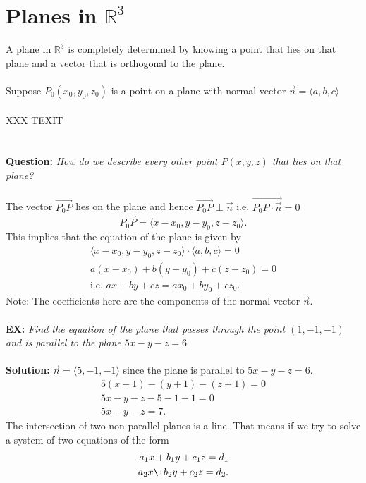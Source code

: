 \documentclass{report}
\begin{document}
\section{Planes in $\mathbb{R}^3$}
A plane in $\mathbb{R}^3$ is completely determined by knowing a point that lies on that plane and a vector that is orthogonal to the plane.\\
\\
Suppose $P_0\left( x_0,y_0,z_0 \right) $ is a point on a plane with normal vector $\vec{n} = \langle a,b,c  \rangle $ \\
\\
XXX TEXIT\\
\\
\\
\textbf{Question:}  \textit{How do we describe every other point $P\left( x,y,z \right) $ that lies on that plane?} \\
\\
The vector $\vec{P_0P} $ lies on the plane and hence $\vec{P_0P} \perp \vec{n} $ i.e. $\vec{P_0P \cdot \vec{n} } =0$ 
\[
\vec{P_0P} = \langle x-x_0, y-y_0, z-z_0  \rangle 
.\] This implies that the equation of the plane is given by 
\begin{align*}
        \langle x-x_0,y-y_0,z-z_0  \rangle \cdot \langle a,b,c  \rangle =0\\
        a\left( x-x_0 \right) +b\left( y-y_0 \right) +c\left( z-z_0 \right) =0\\
        \text{i.e.  } ax+ by +cz = ax_0 + by_0 +cz_0
.\end{align*}
Note: The coefficients here are the components of the normal vector $\vec{n} $.\\
\\
\textbf{EX:}  \textit{Find the equation of the plane that passes through the point $\left( 1,-1,-1 \right) $ and is parallel to the plane $5x-y-z=6$}\\
\\
\textbf{Solution:} $\vec{n} = \langle  5,-1,-1  \rangle $ since the plane is parallel to $5x-y-z=6$.\\
\begin{align*}
        5 \left( x-1 \right) - \left( y+1 \right) - \left( z+1 \right) =0\\
        5x-y -z -5-1-1=0\\
        5x-y-z=7
.\end{align*}
The intersection of two non-parallel planes is a line. That means if we try to solve a system of two equations of the form 
\begin{align*}
        a_1x+b_1y+c_1z=d_1\\
        a_2x\+b_2y+c_2z=d_2
.\end{align*}
\end{document}
